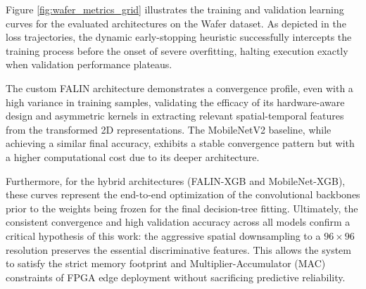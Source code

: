 \documentclass[10pt,conference]{IEEEtran}
\begin{document}
Figure \ref{fig:wafer_metrics_grid} illustrates the training and validation learning curves for the evaluated architectures on the Wafer dataset. As depicted in the loss trajectories, the dynamic early-stopping heuristic successfully intercepts the training process before the onset of severe overfitting, halting execution exactly when validation performance plateaus. 

The custom FALIN architecture demonstrates a convergence profile, even with a high variance in training samples, validating the efficacy of its hardware-aware design and asymmetric kernels in extracting relevant spatial-temporal features from the transformed 2D representations. The MobileNetV2 baseline, while achieving a similar final accuracy, exhibits a stable convergence pattern but with a higher computational cost due to its deeper architecture.

Furthermore, for the hybrid architectures (FALIN-XGB and MobileNet-XGB), these curves represent the end-to-end optimization of the convolutional backbones prior to the weights being frozen for the final decision-tree fitting. Ultimately, the consistent convergence and high validation accuracy across all models confirm a critical hypothesis of this work: the aggressive spatial downsampling to a $96 \times 96$ resolution preserves the essential discriminative features. This allows the system to satisfy the strict memory footprint and Multiplier-Accumulator (MAC) constraints of FPGA edge deployment without sacrificing predictive reliability.
\end{document}
